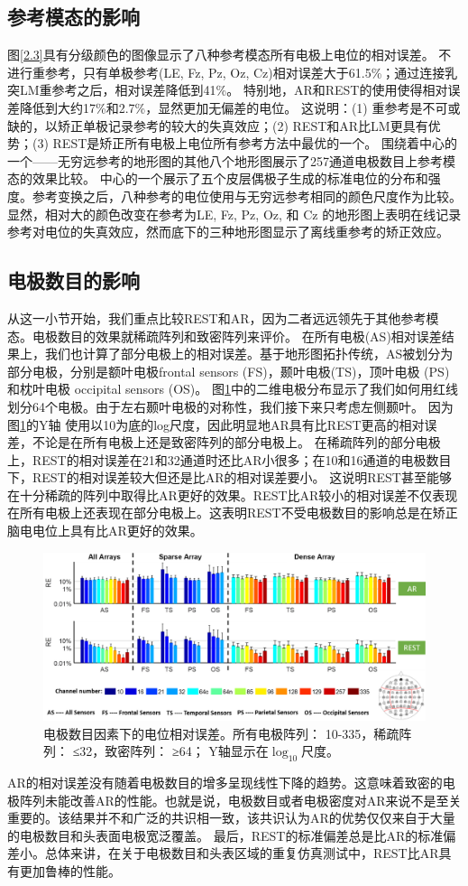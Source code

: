 \subsection{参考模态的影响}
图\ref{2.3}具有分级颜色的图像显示了八种参考模态所有电极上电位的相对误差。 不进行重参考，只有单极参考(LE, Fz, Pz, Oz, Cz)相对误差大于61.5\%；通过连接乳突LM重参考之后，相对误差降低到41\%。 特别地，AR和REST的使用使得相对误差降低到大约17\%和2.7\%，显然更加无偏差的电位。 这说明：(1) 重参考是不可或缺的，以矫正单极记录参考的较大的失真效应；(2) REST和AR比LM更具有优势；(3) REST是矫正所有电极上电位所有参考方法中最优的一个。 围绕着中心的一个——无穷远参考的地形图的其他八个地形图展示了257通道电极数目上参考模态的效果比较。 中心的一个展示了五个皮层偶极子生成的标准电位的分布和强度。参考变换之后，八种参考的电位使用与无穷远参考相同的颜色尺度作为比较。显然，相对大的颜色改变在参考为LE, Fz, Pz, Oz, 和 Cz 的地形图上表明在线记录参考对电位的失真效应，然而底下的三种地形图显示了离线重参考的矫正效应。
\subsection{电极数目的影响}
从这一小节开始，我们重点比较REST和AR，因为二者远远领先于其他参考模态。电极数目的效果就稀疏阵列和致密阵列来评价。 在所有电极(AS)相对误差结果上，我们也计算了部分电极上的相对误差。基于地形图拓扑传统，AS被划分为部分电极，分别是额叶电极frontal sensors
(FS)，颞叶电极(TS)，顶叶电极 (PS) 和枕叶电极 occipital sensors (OS)。 图\ref{2.4}中的二维电极分布显示了我们如何用红线划分64个电极。由于左右颞叶电极的对称性，我们接下来只考虑左侧颞叶。 因为图\ref{2.4}的Y轴
使用以10为底的log尺度，因此明显地AR具有比REST更高的相对误差，不论是在所有电极上还是致密阵列的部分电极上。 在稀疏阵列的部分电极上，REST的相对误差在21和32通道时还比AR小很多；在10和16通道的电极数目下，REST的相对误差较大但还是比AR的相对误差要小。 这说明REST甚至能够在十分稀疏的阵列中取得比AR更好的效果。REST比AR较小的相对误差不仅表现在所有电极上还表现在部分电极上。这表明REST不受电极数目的影响总是在矫正脑电电位上具有比AR更好的效果。
\begin{figure}[h!]
	\centering
	\includegraphics[width=15cm]{pic/JNE/figure4.png}
	\caption{电极数目因素下的电位相对误差。所有电极阵列： 10-335，稀疏阵列： ≤32，致密阵列： ≥64； Y轴显示在$\log_{10}$尺度。}
	\label{2.4}
\end{figure}
AR的相对误差没有随着电极数目的增多呈现线性下降的趋势。这意味着致密的电极阵列未能改善AR的性能。也就是说，电极数目或者电极密度对AR来说不是至关重要的。该结果并不和广泛的共识相一致，该共识认为AR的优势仅仅来自于大量的电极数目和头表面电极宽泛覆盖。
最后，REST的标准偏差总是比AR的标准偏差小。总体来讲，在关于电极数目和头表区域的重复仿真测试中，REST比AR具有更加鲁棒的性能。

